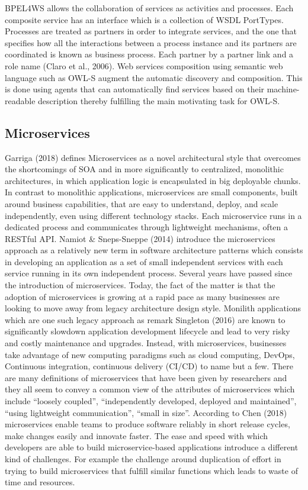 \documentclass{article}
\begin{document}
BPEL4WS  allows  the  collaboration of  services  as  activities  and  processes. Each composite service has an interface which is a collection of WSDL PortTypes. Processes are treated as partners in order to integrate services, and the one that specifies how  all the interactions between a process   instance  and  its  partners are coordinated is known as business process. Each partner by a partner link and a role  name (Claro et al., 2006). Web services composition using  semantic web language such as OWL-S augment the automatic discovery and composition. This is done using agents that can  automatically find  services  based  on  their  machine-readable description thereby fulfilling the  main  motivating  task  for  OWL-S.
 
 \subsection{Microservices}
Garriga (2018) defines Microservices as a novel architectural style that overcomes the shortcomings of SOA and in more significantly to centralized, monolithic architectures, in which application logic is encapsulated in big deployable chunks. In contrast to monolithic applications, microservices are small components, built around business capabilities, that are easy to understand, deploy, and scale independently, even using different technology stacks. Each microservice runs in a dedicated process and communicates through lightweight mechanisms, often a RESTful API. 
Namiot \& Sneps-Sneppe (2014) introduce the microservices approach as a relatively new term in software architecture patterns which consists in developing an application as a set of small independent services with each service running in its own independent process. Several years have passed since the introduction of microservices. Today, the fact of the matter is that the adoption of microservices is growing at a rapid pace as many businesses are looking to move away from legacy architecture design style. Monilith applications which are one such legacy approach as remark Singleton (2016) are known to significantly slowdown application development lifecycle and lead to very risky and costly maintenance and upgrades. Instead, with microservices, businesses take advantage of new computing paradigms such as cloud computing, DevOps, Continuous integration, continuous delivery (CI/CD) to name but a few. 
There are many definitions of microservices that have been given by researchers and they all seem to convey a common view of the attributes of microservices which include “loosely coupled”, “independently developed, deployed and maintained”, “using lightweight communication”, “small in size”. According to Chen (2018) microservices enable teams to produce software reliably in short release cycles, make changes easily and innovate faster. The ease and speed with which developers are able to build microservice-based applications introduce a different kind of challenges. For example the challenge around duplication of effort in trying to build microservices that fulfill similar functions which leads to waste of time and resources. 
\end{document}
